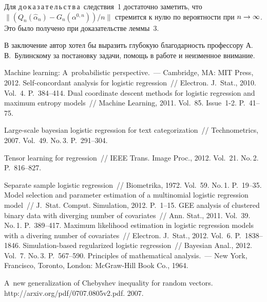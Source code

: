 \begin{multicols}{2}
\medskip

\noindent
Для д\,о\,к\,а\,з\,а\,т\,е\,л\,ь\,с\,т\,в\,а\ следствия~1 достаточно заметить, что 
$\|(Q_n(\widehat{\alpha}_n)-G_n(\alpha^{0,n}))/n\|$ стремится к нулю по вероятности 
при $n\hm\rightarrow\infty$. Это было получено при доказательстве леммы~3.

\bigskip

В заключение автор хотел бы выразить глубокую благодарность профессору 
А.\,В.~Булинскому за постановку задачи, помощь в работе и неизменное внимание.

{\small\frenchspacing
{%
\begin{thebibliography}{99}


 Machine learning: A~probabilistic perspective.~--- 
Cambridge, MA: MIT Press, 2012.
 Self-concordant analysis for logistic regression~//  Electron. J.~Stat., 2010. Vol.~4. P.~384--414.
 Dual coordinate descent methods for logistic regression 
and maximum entropy models~// Machine Learning, 2011. Vol.~85. Issue~1-2. P.~41--75.

 Large-scale bayesian logistic 
regression for text categorization~// Technometrics, 2007. Vol.~49. No.\,3. P.~291--304.

 Tensor learning for regression~// 
IEEE Trans. Image Proc., 2012. Vol.~21. No.\,2. P.~816--827.

 Separate sample logistic regression~//
Biometrika, 1972. Vol.~59. No.\,1. P.~19--35.
 Model selection
and parameter estimation of a multinomial logistic regression model~// 
J.~Stat. Comput. Simulation, 2012. P.~1--15.
 GEE analysis of clustered binary data with diverging number of covariates~// 
Ann. Stat., 2011. Vol.~39. No.\,1. P.~389--417.
 Maximum likelihood estimation in logistic regression models with 
a divering number of covariates~// Electron. J.~Stat., 2012. Vol.~6. P.~1838--1846.
 Simulation-based regularized logistic regression~// 
Bayesian Anal., 2012. Vol.~7. No.\,3. P.~567--590.
 Principles of mathematical analysis.~--- New York, Francisco, Toronto, London: 
McGraw-Hill Book Co., 1964.

\label{end\stat}
 A~new generalization of Chebyshev inequality for random vectors. 
{\sf http://arxiv.org/pdf/0707.0805v2.pdf}. 2007.
\end{thebibliography}
}
}

\end{multicols}